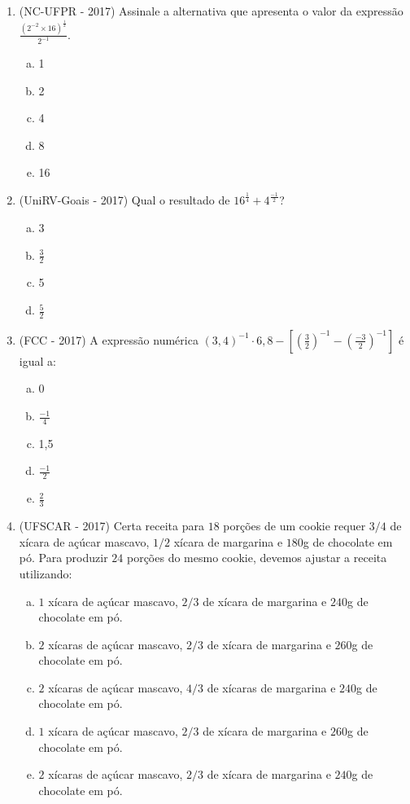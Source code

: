 \begin{enumerate}
  \item (NC-UFPR - 2017) Assinale a alternativa que apresenta o valor da expressão $\frac{(2^{-2} \times 16)^{\frac{1}{2}}}{2^{-1}}$.
   \begin{enumerate}[a)]
  \item 1
  \item 2
  \item 4
  \item 8
  \item 16
  \end{enumerate}

  \item (UniRV-Goais - 2017) Qual o resultado de $16^{\frac{1}{4}} + 4^{\frac{-1}{2}}$?
  \begin{enumerate}[a)]
  \item 3
  \item $\frac{3}{2}$
  \item 5
  \item $\frac{5}{2}$
  \end{enumerate}

  \item (FCC - 2017) A expressão numérica $(3,4)^{-1} \cdot 6,8 - \left[ \left(\frac{3}{2} \right)^{-1} - \left(\frac{-3}{2} \right)^{-1} \right]$ é igual a:
  \begin{enumerate}[a)]
  \item 0
  \item $\frac{-1}{4}$
  \item 1,5
  \item $\frac{-1}{2}$
  \item $\frac{2}{3}$
  \end{enumerate}

  \item (UFSCAR - 2017) Certa receita para $18$ porções de um cookie requer $3/4$ de xícara de açúcar mascavo, $1/2$ xícara de margarina e $180$g de chocolate em pó. Para produzir $24$ porções do mesmo cookie, devemos ajustar a receita utilizando:
   \begin{enumerate}[a)]
  \item $1$ xícara de açúcar mascavo, $2/3$ de xícara de margarina e $240$g de chocolate em pó.
  \item $2$ xícaras de açúcar mascavo, $2/3$ de xícara de margarina e $260$g de chocolate em pó.
  \item $2$ xícaras de açúcar mascavo, $4/3$ de xícaras de margarina e $240$g de chocolate em pó.
  \item $1$ xícara de açúcar mascavo, $2/3$ de xícara de margarina e $260$g de chocolate em pó.
  \item $2$ xícaras de açúcar mascavo, $2/3$ de xícara de margarina e $240$g de chocolate em pó.
  \end{enumerate}



\end{enumerate}
